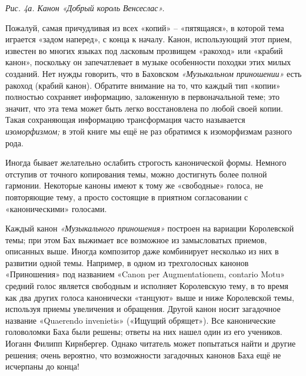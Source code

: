 \documentclass[../main.tex]{subfiles}
\begin{document}
\emph{Рис. 4а. Канон «Добрый король Венсеслас».}

Пожалуй, самая причудливая из всех «копий» \--- «пятящаяся», в которой тема играется «задом наперед», с конца к началу. Канон, использующий этот прием, известен во многих языках под ласковым прозвищем «ракоход» или «крабий канон», поскольку он запечатлевает в музыке особенности походки этих милых созданий. Нет нужды говорить, что в Баховском \emph{«Музыкальном приношении»} есть ракоход (крабий канон). Обратите внимание на то, что каждый тип «копии» полностью сохраняет информацию, заложенную в первоначальной теме; это значит, что эта тема может быть легко восстановлена по любой своей копии. Такая сохраняющая информацию трансформация часто называется \emph{изоморфизмом;} в этой книге мы ещё не раз обратимся к изоморфизмам разного рода.

Иногда бывает желательно ослабить строгость канонической формы. Немного отступив от точного копирования темы, можно достигнуть более полной гармонии. Некоторые каноны имеют к тому же «свободные» голоса, не повторяющие тему, а просто состоящие в приятном согласовании с «каноническими» голосами.

Каждый канон \emph{«Музыкального приношения»} построен на вариации Королевской темы; при этом Бах выжимает все возможное из замысловатых приемов, описанных выше. Иногда композитор даже комбинирует несколько из них в развитии одной темы. Например, в одном из трехголосных канонов «Приношения» под названием «Canon per Augmentationem, contario Motu» средний голос является свободным и исполняет Королевскую тему, в то время как два других голоса канонически «танцуют» выше и ниже Королевской темы, используя приемы увеличения и обращения. Другой канон носит загадочное название «Quaerendo invenietis» («Ищущий обрящет»). Все канонические головоломки Баха были решены; ответы на них нашел один из его учеников. Иоганн Филипп Кирнбергер. Однако читатель может попытаться найти и другие решения; очень вероятно, что возможности загадочных канонов Баха ещё не исчерпаны до конца!
\end{document}
